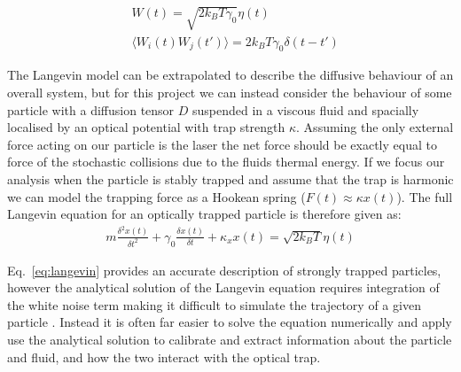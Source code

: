 \begin{align}
	&W(t) = \sqrt{2k_BT\gamma_0}\eta(t) \\
	&\langle W_i(t)W_j(t')\rangle = 2k_BT\gamma_0\delta(t-t')
\end{align}

The Langevin model can be extrapolated to describe the diffusive behaviour of an overall system, but for this project we can instead consider the behaviour of some particle with a diffusion tensor $D$ suspended in a viscous fluid and spacially localised by an optical potential with trap strength $\kappa$. Assuming the only external force acting on our particle is the laser the net force should be exactly equal to force of the stochastic collisions due to the fluids thermal energy. If we focus our analysis when the particle is stably trapped and assume that the trap is harmonic we can model the trapping force as a Hookean spring ($F(t) \approx \kappa x(t)$). The full Langevin equation for an optically trapped particle is therefore given as:
\begin{align}
	\label{eq:langevin}
	m\frac{\delta^2x(t)}{\delta t^2} + \gamma_0 \frac{\delta x(t)}{\delta t} + \kappa_x x(t) = \sqrt{2k_BT}\eta(t)
\end{align}

Eq.~\ref{eq:langevin} provides an accurate description of strongly trapped particles, however the analytical solution of the Langevin equation requires integration of the white noise term making it difficult to simulate the trajectory of a given particle \cite{Volpe2013}. Instead it is often far easier to solve the equation numerically and apply use the analytical solution to calibrate and extract information about the particle and fluid, and how the two interact with the optical trap.

